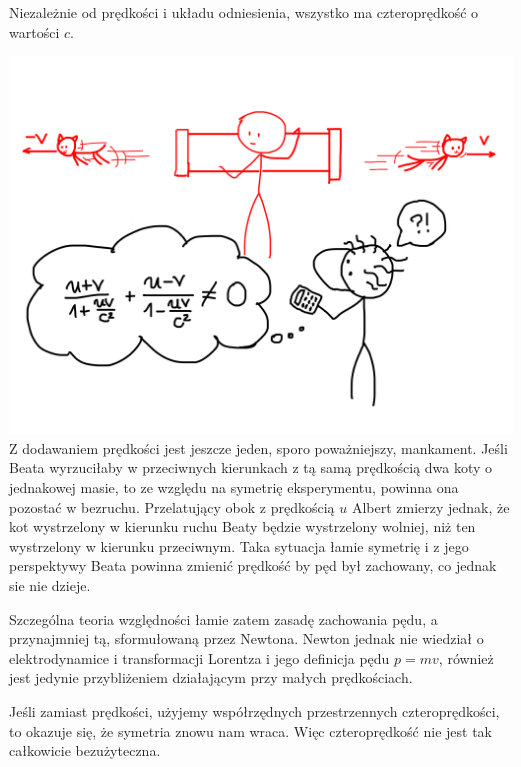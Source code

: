 \documentclass[10pt,twocolumn,fleqn,polish]{article}
\begin{document}
Niezależnie od prędkości i układu odniesienia, wszystko ma czteroprędkość
o wartości $c$.
\newpage

\noindent\includegraphics[width=1\linewidth]{pages/page-35-1.png}
Z dodawaniem prędkości jest jeszcze jeden, sporo poważniejszy, mankament.
Jeśli Beata wyrzuciłaby w przeciwnych kierunkach z tą samą prędkością dwa koty
o jednakowej masie, to ze względu na symetrię eksperymentu, powinna ona pozostać
w bezruchu. Przelatujący obok z prędkością $u$ Albert zmierzy jednak, że kot
wystrzelony w kierunku ruchu Beaty będzie wystrzelony wolniej, niż ten
wystrzelony w kierunku przeciwnym. Taka sytuacja łamie symetrię i z jego perspektywy
Beata powinna zmienić prędkość by pęd był zachowany, co jednak sie nie dzieje.

Szczególna teoria względności łamie zatem zasadę zachowania pędu, a przynajmniej
tą, sformułowaną przez Newtona. Newton jednak nie wiedział o elektrodynamice
i transformacji Lorentza i jego definicja pędu $p = mv$, również jest jedynie
przybliżeniem działającym przy małych prędkościach.

Jeśli zamiast prędkości, użyjemy współrzędnych przestrzennych czteroprędkości, to
okazuje się, że symetria znowu nam wraca. Więc czteroprędkość nie jest tak
całkowicie bezużyteczna.
\newpage
\end{document}
